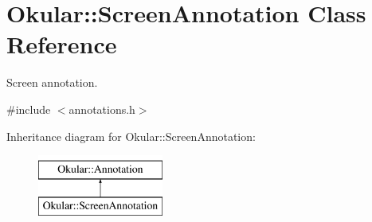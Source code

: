 \hypertarget{classOkular_1_1ScreenAnnotation}{\section{Okular\+:\+:Screen\+Annotation Class Reference}
\label{classOkular_1_1ScreenAnnotation}
}


Screen annotation.  




{\ttfamily \#include $<$annotations.\+h$>$}

Inheritance diagram for Okular\+:\+:Screen\+Annotation\+:\begin{figure}[H]
\begin{center}
\leavevmode
\includegraphics[height=2.000000cm]{classOkular_1_1ScreenAnnotation}
\end{center}
\end{figure}
